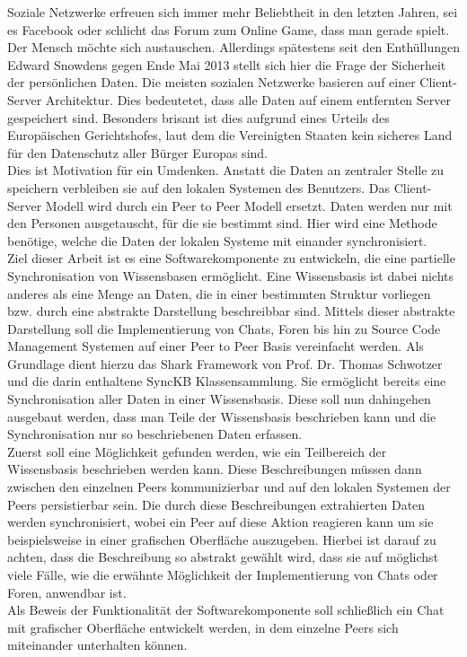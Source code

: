 \documentclass[a4paper]{article}
\begin{document}
	Soziale Netzwerke erfreuen sich immer mehr Beliebtheit in den letzten Jahren, 
	sei es Facebook oder schlicht das Forum zum Online Game, dass man gerade
	spielt. Der Mensch möchte sich austauschen. Allerdings spätestens seit den
	Enthüllungen Edward Snowdens gegen Ende Mai 2013 stellt sich hier die Frage
	der Sicherheit der persönlichen Daten. Die meisten sozialen Netzwerke basieren
	auf einer Client-Server Architektur. Dies bedeutetet, dass alle Daten auf einem
	entfernten Server gespeichert sind. Besonders brisant ist dies aufgrund eines
	Urteils des Europäischen Gerichtshofes, laut dem die Vereinigten Staaten kein
	sicheres Land für den Datenschutz aller Bürger Europas sind. \cite{welt} \\
	 
	Dies ist Motivation für ein Umdenken. Anstatt die Daten an zentraler Stelle
	zu speichern verbleiben sie auf den lokalen Systemen des Benutzers. Das
	Client-Server Modell wird durch ein Peer to Peer Modell ersetzt. Daten
	werden nur mit den Personen ausgetauscht, für die sie bestimmt sind.
	Hier wird eine Methode benötige, welche die Daten der lokalen Systeme
	mit einander synchronisiert. \\

	Ziel dieser Arbeit ist es eine Softwarekomponente zu entwickeln, die eine 
	partielle Synchronisation von Wissensbasen ermöglicht. Eine Wissensbasis
	ist dabei nichts anderes als eine Menge an Daten, die in einer
	bestimmten Struktur vorliegen bzw. durch eine abstrakte Darstellung
	beschreibbar sind. Mittels dieser abstrakte Darstellung soll die 
	Implementierung von Chats, Foren bis hin zu Source Code Management Systemen
	auf einer Peer to Peer Basis vereinfacht werden.
	Als Grundlage dient hierzu das Shark Framework \cite{SharkFW} von Prof.
	Dr.	Thomas Schwotzer und die darin enthaltene SyncKB Klassensammlung. Sie
	ermöglicht bereits eine Synchronisation aller Daten in einer Wissensbasis.
	Diese soll nun dahingehen ausgebaut werden, dass man Teile der Wissensbasis
	beschrieben kann und die Synchronisation nur so beschriebenen Daten erfassen. \\
	
	Zuerst soll eine Möglichkeit gefunden werden, wie ein Teilbereich der
	Wissensbasis beschrieben werden kann. Diese Beschreibungen müssen dann
	zwischen den einzelnen Peers kommunizierbar und auf den lokalen Systemen der
	Peers persistierbar sein. Die durch diese Beschreibungen extrahierten Daten
	werden synchronisiert, wobei ein Peer auf diese Aktion reagieren kann um
	sie beispielsweise in einer grafischen Oberfläche auszugeben. Hierbei
	ist darauf zu achten, dass die Beschreibung so abstrakt gewählt wird, dass 
	sie	auf möglichst viele Fälle, wie die erwähnte Möglichkeit der 
	Implementierung von Chats oder Foren, anwendbar ist. \\
	Als Beweis der Funktionalität der Softwarekomponente soll schließlich
	ein Chat mit grafischer Oberfläche entwickelt werden, in dem einzelne Peers sich
	miteinander	unterhalten können.\\
	
\end{document}
